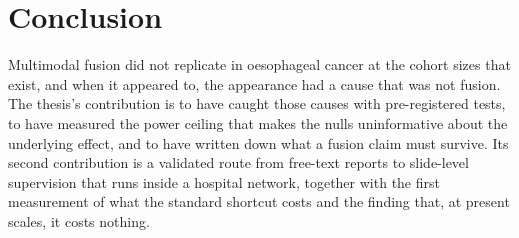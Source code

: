 \section{Conclusion}

Multimodal fusion did not replicate in oesophageal cancer at the cohort sizes that exist, and when it appeared to, the appearance had a cause that was not fusion. The thesis's contribution is to have caught those causes with pre-registered tests, to have measured the power ceiling that makes the nulls uninformative about the underlying effect, and to have written down what a fusion claim must survive. Its second contribution is a validated route from free-text reports to slide-level supervision that runs inside a hospital network, together with the first measurement of what the standard shortcut costs and the finding that, at present scales, it costs nothing.

